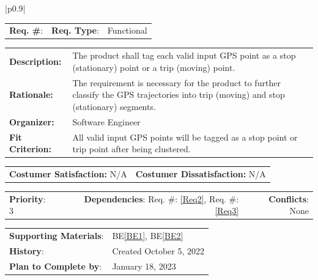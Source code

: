 \documentclass[12pt, titlepage]{article}
\newcommand{\beref}[1]{BE\ref{#1}}
\newcounter{reqnum}
\newcommand{\reqthereqnum}{\textbf{Req. \#}: \thereqnum}
\newcommand{\reqref}[1]{Req. \#: \ref{#1}}
\newenvironment{boxed}
    {\begin{center}
    \begin{tabular}{|p{0.9\textwidth}|}
    \hline\\
    }
    { 
    \\\\\hline
    \end{tabular} 
    \end{center}
    }
\begin{document}
\begin{boxed}
\begin{tabular}{l r r}
{reqnum} \reqthereqnum \label{Req4} & {\bf Req. Type}: &  Functional\\
\end{tabular}
\newline
\begin{tabular}{l p{11.5cm}}
    {\bf Description:} & The product shall tag each valid input GPS point as a stop (stationary) point or a trip (moving) point.  \\
    {\bf Rationale:} & The requirement is necessary for the product to further classify the GPS trajectories into trip (moving) and stop (stationary) segments.\\
    {\bf Organizer:} & Software Engineer\\
    {\bf Fit Criterion:} & All valid input GPS points will be tagged as a stop point or trip point after being clustered. \\
\end{tabular}
\begin{tabular}{l r}
{\bf Costumer Satisfaction:} N/A &  {\bf Costumer Dissatisfaction:}  N/A\\
\end{tabular}
\begin{tabular}{l r r}
    {\bf Priority}: 3 & {\bf Dependencies}: \reqref{Req2}, \reqref{Req3}  & {\bf Conflicts}: None \\
\end{tabular}
\begin{tabular}{l l}
     {\bf Supporting Materials}:& 
     \beref{BE1}, \beref{BE2} \\ 
     {\bf History}: & Created October 5, 2022\\
     {\bf Plan to Complete by}: & January 18, 2023\\
\end{tabular}
\end{boxed}
\end{document}
